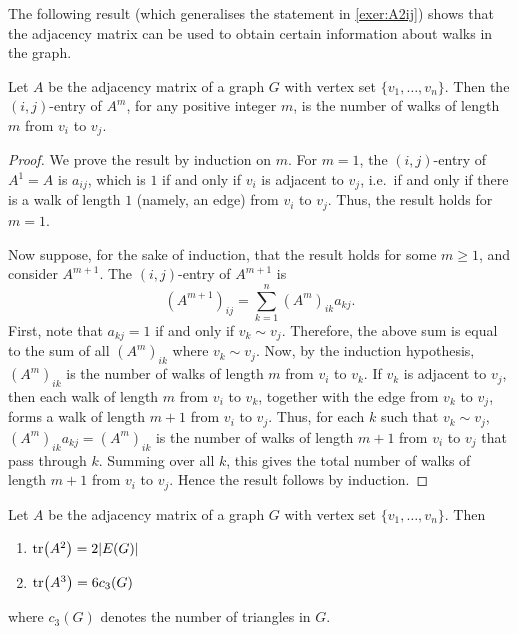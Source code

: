 The following result (which generalises the statement in \cref{exer:A2ij}) shows that the adjacency matrix can be used to obtain certain information about walks in the graph.

\begin{Theorem}
Let $A$ be the adjacency matrix of a graph $G$ with vertex set $\{v_1, \ldots, v_n\}$. Then the $(i,j)$-entry of $A^m$, for any positive integer $m$, is the number of walks of length $m$ from $v_i$ to $v_j$.
\end{Theorem}

\begin{proof}
We prove the result by induction on $m$. For $m = 1$, the $(i,j)$-entry of $A^1 = A$ is $a_{ij}$, which is $1$ if and only if $v_i$ is adjacent to $v_j$, i.e.\ if and only if there is a walk of length $1$ (namely, an edge) from $v_i$ to $v_j$. Thus, the result holds for $m = 1$.

Now suppose, for the sake of induction, that the result holds for some $m \ge 1$, and consider $A^{m + 1}$. The $(i,j)$-entry of $A^{m + 1}$ is
\begin{equation*}
(A^{m + 1})_{ij} = \sum_{k = 1}^{n} (A^m)_{ik} a_{kj}.
\end{equation*}
First, note that $a_{kj} = 1$ if and only if $v_k \sim v_j$. Therefore, the above sum is equal to the sum of all $(A^m)_{ik}$ where $v_k \sim v_j$. Now, by the induction hypothesis, $(A^m)_{ik}$ is the number of walks of length $m$ from $v_i$ to $v_k$. If $v_k$ is adjacent to $v_j$, then each walk of length $m$ from $v_i$ to $v_k$, together with the edge from $v_k$ to $v_j$, forms a walk of length $m + 1$ from $v_i$ to $v_j$. Thus, for each $k$ such that $v_k \sim v_j$, $(A^m)_{ik} a_{kj} = (A^m)_{ik}$ is the number of walks of length $m + 1$ from $v_i$ to $v_j$ that pass through $k$. Summing over all $k$, this gives the total number of walks of length $m + 1$ from $v_i$ to $v_j$. Hence the result follows by induction.
\end{proof}

\begin{Theorem}
Let $A$ be the adjacency matrix of a graph $G$ with vertex set $\{v_1, \ldots, v_n\}$. Then
\begin{enumerate}[label=(\roman*)]
\item $\tr(A^2) = 2 |E(G)|$
\item $\tr(A^3) = 6 c_3(G)$
\end{enumerate}
where $c_3(G)$ denotes the number of triangles in $G$.
\end{Theorem}

